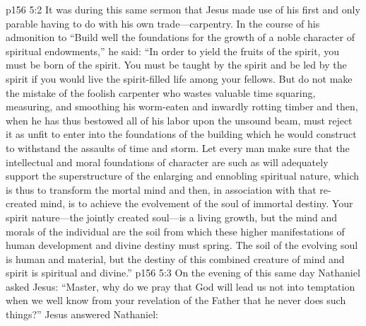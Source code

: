 \vs p156 5:2 It was during this same sermon that Jesus made use of his first and only parable having to do with his own trade---carpentry. In the course of his admonition to \textcolor{ubdarkred}{“Build well the foundations for the growth of a noble character of spiritual endowments,”} he said: \textcolor{ubdarkred}{“In order to yield the fruits of the spirit, you must be born of the spirit. You must be taught by the spirit and be led by the spirit if you would live the spirit\hyp{}filled life among your fellows. But do not make the mistake of the foolish carpenter who wastes valuable time squaring, measuring, and smoothing his worm\hyp{}eaten and inwardly rotting timber and then, when he has thus bestowed all of his labor upon the unsound beam, must reject it as unfit to enter into the foundations of the building which he would construct to withstand the assaults of time and storm. Let every man make sure that the intellectual and moral foundations of character are such as will adequately support the superstructure of the enlarging and ennobling spiritual nature, which is thus to transform the mortal mind and then, in association with that re\hyp{}created mind, is to achieve the evolvement of the soul of immortal destiny. Your spirit nature---the jointly created soul---is a living growth, but the mind and morals of the individual are the soil from which these higher manifestations of human development and divine destiny must spring. The soil of the evolving soul is human and material, but the destiny of this combined creature of mind and spirit is spiritual and divine.”}
\vs p156 5:3 On the evening of this same day Nathaniel asked Jesus: “Master, why do we pray that God will lead us not into temptation when we well know from your revelation of the Father that he never does such things?” Jesus answered Nathaniel:
